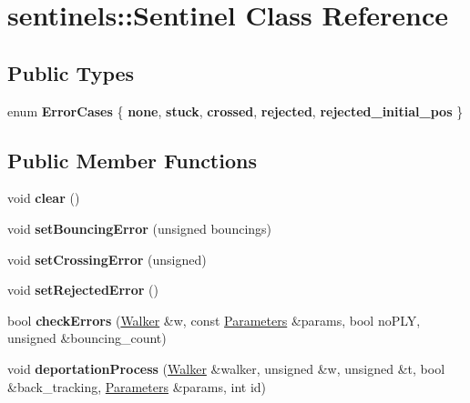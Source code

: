 \hypertarget{classsentinels_1_1_sentinel}{}\section{sentinels\+:\+:Sentinel Class Reference}
\label{classsentinels_1_1_sentinel}
\subsection*{Public Types}
\begin{DoxyCompactItemize}
\item 
\mbox{\label{classsentinels_1_1_sentinel_a82dc9b174c5d4c23b747b083f6ba7dbd}} 
enum {\bfseries Error\+Cases} \{ \newline
{\bfseries none}, 
{\bfseries stuck}, 
{\bfseries crossed}, 
{\bfseries rejected}, 
\newline
{\bfseries rejected\+\_\+initial\+\_\+pos}
 \}
\end{DoxyCompactItemize}
\subsection*{Public Member Functions}
\begin{DoxyCompactItemize}
\item 
\mbox{\label{classsentinels_1_1_sentinel_ad292b3700a6f7172e31aba2c3c57d800}} 
void {\bfseries clear} ()
\item 
\mbox{\label{classsentinels_1_1_sentinel_a88cb42ad4144fcd6079117fe71e762ed}} 
void {\bfseries set\+Bouncing\+Error} (unsigned bouncings)
\item 
\mbox{\label{classsentinels_1_1_sentinel_a19710e1e2a694442d64772c63307c110}} 
void {\bfseries set\+Crossing\+Error} (unsigned)
\item 
\mbox{\label{classsentinels_1_1_sentinel_a75fbb7413866ebf130fd6d28fa4a77b9}} 
void {\bfseries set\+Rejected\+Error} ()
\item 
\mbox{\label{classsentinels_1_1_sentinel_a43d8a814622b8c3ad0290d7cc2c7202e}} 
bool {\bfseries check\+Errors} (\hyperlink{class_walker}{Walker} \&w, const \hyperlink{class_parameters}{Parameters} \&params, bool no\+P\+LY, unsigned \&bouncing\+\_\+count)
\item 
\mbox{\label{classsentinels_1_1_sentinel_aabce46b0d258a94d0401d80904e3b1f4}} 
void {\bfseries deportation\+Process} (\hyperlink{class_walker}{Walker} \&walker, unsigned \&w, unsigned \&t, bool \&back\+\_\+tracking, \hyperlink{class_parameters}{Parameters} \&params, int id)
\end{DoxyCompactItemize}
